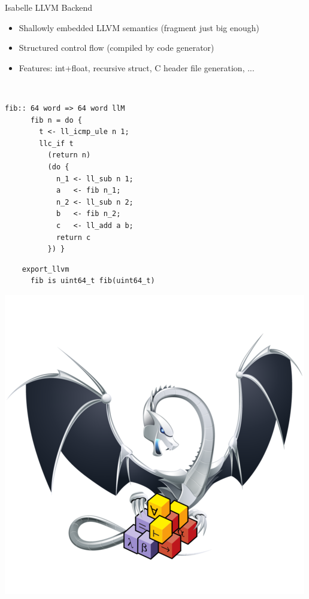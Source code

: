 \documentclass[fleqn]{beamer}
\begin{document}
\begin{frame}[fragile]{Isabelle LLVM Backend}
  \begin{itemize}
   \item Shallowly embedded LLVM semantics (fragment just big enough)
   \item Structured control flow (compiled by code generator)
   \item Features: int+float, recursive struct, C header file generation, ...

  \end{itemize}
  {\small
  \begin{minipage}{.05\textwidth}{\ }\end{minipage}
  \begin{minipage}{.45\textwidth}
    \begin{lstlisting}[escapechar=!]
      fib:: 64 word => 64 word llM
      fib n = do {
        t <- ll_icmp_ule n 1;
        llc_if t
          (return n)
          (do {
            n_1 <- ll_sub n 1;
            a   <- fib n_1;
            n_2 <- ll_sub n 2;
            b   <- fib n_2;
            c   <- ll_add a b;
            return c
          }) }
    \end{lstlisting}
  \end{minipage}%
  \begin{minipage}{.3\textwidth}
  \begin{lstlisting}
    export_llvm
      fib is uint64_t fib(uint64_t)
  \end{lstlisting}
  \includegraphics[width=\textwidth]{isabelle-llvm.png}
  \end{minipage}
  }





\end{frame}
\end{document}
